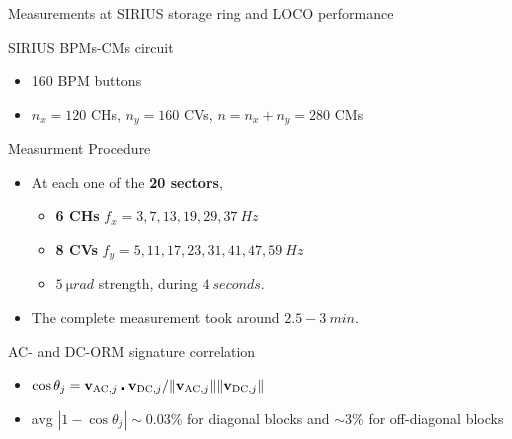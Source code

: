 \documentclass[aspectratio=169]{beamer}
\begin{document}
\begin{frame}{Measurements at SIRIUS storage ring and LOCO performance}
    \begin{minipage}{0.49\textwidth}
        \scriptsize
        SIRIUS BPMs-CMs circuit
        \begin{itemize}
            \item 160 BPM buttons
            \item $n_x = 120$ CHs, $n_y=160$ CVs, $n=n_x+n_y=280$ CMs
        \end{itemize}
        Measurment Procedure
        \begin{itemize}
            \item At each one of the \textbf{20 sectors},
            \begin{itemize}
            \scriptsize
            \item \textbf{6 CHs} $f_x = 3,  7, 13, 19, 29, 37\ \unit{Hz}$
            \item \textbf{8 CVs} $f_y = 5, 11, 17, 23, 31, 41, 47, 59\ \unit{Hz}$
            \item $\unit{5~\micro rad}$ strength, during $\unit{4~seconds}$.
            \end{itemize}
            \item  The complete measurement took around $2.5-3\ \unit{min}$.
        \end{itemize}
    AC- and DC-ORM signature correlation
    \begin{itemize}
        \scriptsize
        \item $\cos\theta_j = \vb{v}_{\text{AC}, j}\centerdot \vb{v}_{\text{DC}, j}/\norm{\vb{v}_{\text{AC}, j}}\norm{\vb{v}_{\text{DC}, j}}$
        \item avg $|1 - \cos\theta_j|\sim0.03\%$ for diagonal blocks and $\sim3\%$ for off-diagonal blocks
    \end{itemize}
    \end{minipage}
    \hfill
    \begin{minipage}{0.49\textwidth}
        \begin{figure}
            \centering

\end{figure}
\end{minipage}
\end{frame}
\end{document}
